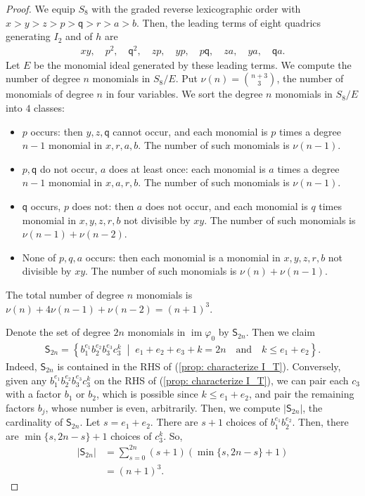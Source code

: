 \documentclass[11pt]{amsart}
\theoremstyle{definition}
\theoremstyle{remark}
\begin{document}
\begin{proof}
We equip $S_8$ with the graded reverse lexicographic order with $x>y>z>p>\mathsf{q}>r>a>b$. Then, the leading terms of eight quadrics generating $I_2$ and of $h$ are 
\begin{align}\label{leading terms}
xy,\quad p^2,\quad \mathsf{q}^2,\quad zp,\quad yp,\quad p\mathsf{q},\quad za,\quad ya,\quad \mathsf{q}a.
\end{align} 
Let $E$ be the monomial ideal generated by these leading terms. We compute the number of degree $n$ monomials in $S_8/E$. Put $\nu(n)=\binom{n+3}{3}$, the number of monomials of degree $n$ in four variables. We sort the degree $n$ monomials in $S_8/E$ into $4$ classes:
\begin{itemize}
\item $p$ occurs: then $y,z,\mathsf q$ cannot occur, and each monomial is $p$ times a degree $n-1$ monomial in $x,r,a,b$. The number of such monomials is $\nu(n-1)$. 
\item $p,\mathsf{q}$ do not occur, $a$ does at least once: each monomial is $a$ times a degree $n-1$ monomial in $x,a,r,b$. The number of such monomials is $\nu(n-1)$. 
\item $\mathsf{q}$ occurs, $p$ does not: then $a$ does not occur, and each monomial is $q$ times monomial in $x,y,z,r,b$ not divisible by $xy$. The number of such monomials is $\nu(n-1)+\nu(n-2)$.
\item None of $p,q,a$ occurs: then each monomial is a monomial in $x,y,z,r,b$ not divisible by $xy$. The number of such monomials is $\nu(n)+\nu(n-1).  $
\end{itemize}
 The total number of degree $n$ monomials is $\nu(n)+4\nu(n-1)+\nu(n-2)=(n+1)^3$. 
	
Denote the set of degree $2n$ monomials in $\operatorname{im} \varphi_0$ by $\mathsf S_{2n}$. Then we claim
\begin{align}\label{prop: characterize I_T}
\mathsf S_{2n}=\left\{
b_1^{e_1} b_2^{e_2} b_3^{e_3} c_3^k
\;\middle|\;
e_1+e_2+e_3+k=2n
\quad\text{and}\quad
k \leq e_1+e_2
\right\}.
\end{align}
Indeed, $\mathsf S_{2n}$ is contained in the RHS of (\ref{prop: characterize I_T}). Conversely, given any $b_1^{e_1}b_2^{e_2}b_3^{e_3}c_3^k$ on the RHS of (\ref{prop: characterize I_T}), we can pair each $c_3$ with a factor $b_1$ or $b_2$, which is possible since $k\leq e_1+e_2$, and pair the remaining factors $b_j$, whose number is even, arbitrarily. Then, we compute $|\mathsf{S}_{2n}|$, the cardinality of  $\mathsf{S}_{2n}$. Let $s=e_1+e_2$. There are $s+1$ choices of $b_1^{e_1}b_2^{e_2}$. Then, there are $\min\{s,2n-s\}+1$ choices  of $c_3^k$. So, 
\begin{align*}
|\mathsf{S}_{2n}|&=\sum_{s=0}^{2n}(s+1)(\min\{s,2n-s\}+1)\\
&=(n+1)^3.
\end{align*}


\end{proof}
\end{document}

